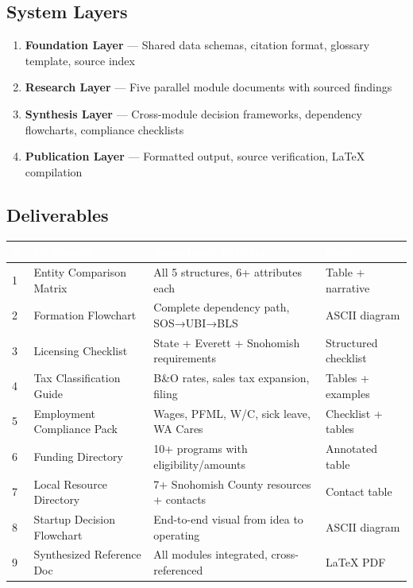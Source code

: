 \documentclass[11pt,letterpaper]{article}
\newcommand{\tableheader}[1]{\textbf{\sffamily\textcolor{white}{#1}}}
\begin{document}
\subsection{System Layers}

\begin{enumerate}[leftmargin=2.5em]
  \item \textbf{Foundation Layer} --- Shared data schemas, citation format, glossary template, source index
  \item \textbf{Research Layer} --- Five parallel module documents with sourced findings
  \item \textbf{Synthesis Layer} --- Cross-module decision frameworks, dependency flowcharts, compliance checklists
  \item \textbf{Publication Layer} --- Formatted output, source verification, LaTeX compilation
\end{enumerate}

\subsection{Deliverables}

\begin{center}
\begin{tabularx}{\textwidth}{C{0.5cm}L{3.5cm}XL{3cm}}
\toprule
{}
\tableheader{\#} & \tableheader{Deliverable} & \tableheader{Acceptance Criteria} & \tableheader{Spec} \\
 & Entity Comparison Matrix & All 5 structures, 6+ attributes each & Table + narrative \\
2 & Formation Flowchart & Complete dependency path, SOS→UBI→BLS & ASCII diagram \\
3 & Licensing Checklist & State + Everett + Snohomish requirements & Structured checklist \\
4 & Tax Classification Guide & B\&O rates, sales tax expansion, filing & Tables + examples \\
5 & Employment Compliance Pack & Wages, PFML, W/C, sick leave, WA Cares & Checklist + tables \\
6 & Funding Directory & 10+ programs with eligibility/amounts & Annotated table \\
7 & Local Resource Directory & 7+ Snohomish County resources + contacts & Contact table \\
8 & Startup Decision Flowchart & End-to-end visual from idea to operating & ASCII diagram \\
9 & Synthesized Reference Doc & All modules integrated, cross-referenced & LaTeX PDF \\
\bottomrule
\end{tabularx}
\end{center}
\end{document}
